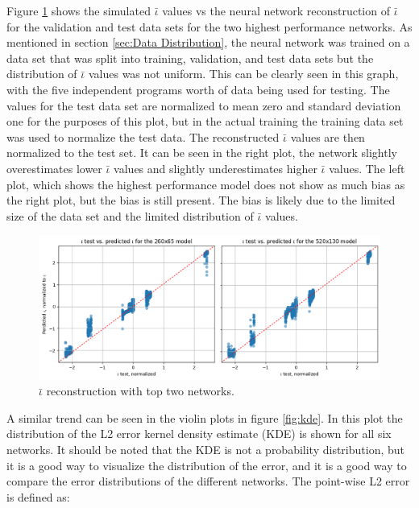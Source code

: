 Figure \ref{fig:iota_vs_pred} shows the simulated $\bar{\iota}$ values vs the neural network reconstruction of $\bar{\iota}$ for the validation and test data sets for the two highest performance networks. As mentioned in section \ref{sec:Data Distribution}, the neural network was trained on a data set that was split into training, validation, and test data sets but the distribution of $\bar{\iota}$ values was not uniform. This can be clearly seen in this graph, with the five independent programs worth of data being used for testing. The values for the test data set are normalized to mean zero and standard deviation one for the purposes of this plot, but in the actual training the training data set was used to normalize the test data. The reconstructed $\bar\iota$ values are then normalized to the test set. It can be seen in the right plot, the network slightly overestimates lower $\bar{\iota}$ values and slightly underestimates higher $\bar{\iota}$ values. The left plot, which shows the highest performance model does not show as much bias as the right plot, but the bias is still present. The bias is likely due to the limited size of the data set and the limited distribution of $\bar{\iota}$ values.


\begin{figure}[!htb]
    \centering
    \includegraphics[width = \textwidth]{images/iota_vs_pred.png}
    \caption{$\bar{\iota}$ reconstruction with top two networks.} \label{fig:iota_vs_pred}
\end{figure}

A similar trend can be seen in the violin plots in figure \ref{fig:kde}. In this plot the distribution of the L2 error kernel density estimate (KDE) is shown for all six networks. It should be noted that the KDE is not a probability distribution, but it is a good way to visualize the distribution of the error, and it is a good way to compare the error distributions of the different networks. The point-wise L2 error is defined as:

